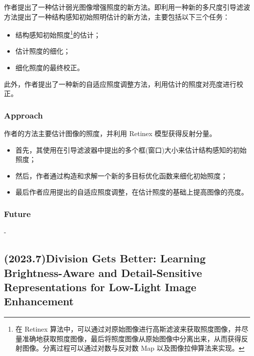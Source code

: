 \documentclass[letterpaper,10pt]{article}
\begin{document}
			作者提出了一种估计弱光图像增强照度的新方法。即利用一种新的多尺度引导滤波方法提出了一种结构感知初始照明估计的新方法，主要包括以下三个任务：
			
			\begin{itemize}
				\item[(1)] 
				结构感知初始照度\footnote{在 Retinex 算法中，可以通过对原始图像进行高斯滤波来获取照度图像，并尽量准确地获取照度图像，最后将照度图像从原始图像中分离出来，从而获得反射图像。分离过程可以通过对数与反对数 Map 以及图像拉伸算法来实现。}的估计；
				
				\item[(2)]
				估计照度的细化；
				
				\item[(3)]
				细化照度的最终校正。
			\end{itemize}	
			
			此外，作者提出了一种新的自适应照度调整方法，利用估计的照度对亮度进行校正。
			
			\subsubsection{Approach}
			
			作者的方法主要估计图像的照度，并利用 Retinex 模型获得反射分量。
			
			\begin{itemize}
				\item[(1)] 
				首先，其使用在引导滤波器中提出的多个框(窗口)大小来估计结构感知的初始照度；
				
				\item[(2)]
				然后，作者通过构造和求解一个新的多目标优化函数来细化初始照度；
				
				\item[(3)]
				最后作者应用提出的自适应照度调整，在估计照度的基础上提高图像的亮度。
			\end{itemize}	
			
			\subsubsection{Future}
			
			- 
		
		\subsection{(2023.7)Division Gets Better: Learning Brightness-Aware and Detail-Sensitive Representations for Low-Light Image Enhancement}
		
\end{document}

